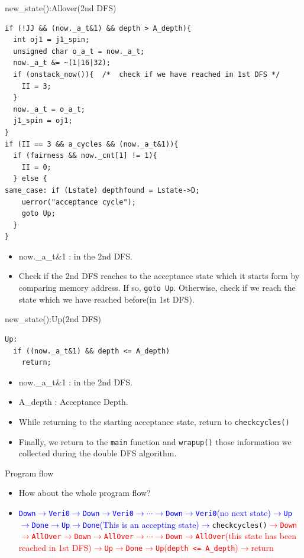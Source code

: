 \documentclass[12pt]{beamer}
\newcommand{\code}[1]{\texttt{#1}}
\begin{document}
\begin{frame}[fragile]{new\_state():Allover(2nd DFS)}
\begin{lstlisting}[basicstyle=\footnotesize\ttfamily]
if (!JJ && (now._a_t&1) && depth > A_depth){
  int oj1 = j1_spin;
  unsigned char o_a_t = now._a_t;
  now._a_t &= ~(1|16|32);
  if (onstack_now()){  /*  check if we have reached in 1st DFS */
    II = 3;
  }
  now._a_t = o_a_t;
  j1_spin = oj1;
}
if (II == 3 && a_cycles && (now._a_t&1)){
  if (fairness && now._cnt[1] != 1){
    II = 0;
  } else {
same_case: if (Lstate) depthfound = Lstate->D;
    uerror("acceptance cycle");
    goto Up;
  }
}
\end{lstlisting}
\begin{itemize}
	\item now.\_a\_t\&1 : in the 2nd DFS.
	\item Check if the 2nd DFS reaches to the acceptance state which it starts form by comparing memory address. If so, \code{goto Up}. Otherwise, check if we reach the state which we have reached before(in 1st DFS).
\end{itemize}
\end{frame}

\begin{frame}[fragile]{new\_state():Up(2nd DFS)}
\begin{lstlisting}[basicstyle=\footnotesize\ttfamily]
Up:
  if ((now._a_t&1) && depth <= A_depth)
    return;
\end{lstlisting}
\begin{itemize}
	\item now.\_a\_t\&1 : in the 2nd DFS.
	\item A\_depth : Acceptance Depth.
	\item While returning to the starting acceptance state, return to \code{checkcycles()}
	\item Finally, we return to the \code{main} function and \code{wrapup()} those information we collected during the double DFS algorithm.
\end{itemize}
\end{frame}

\begin{frame}[fragile]{Program flow}
\begin{itemize}
	\item How about the whole program flow?
	\item 
	\textcolor{blue}{\code{Down}$\rightarrow$\code{Veri0}$\rightarrow$\code{Down}$\rightarrow$\code{Veri0}$\rightarrow\cdots\rightarrow$\code{Down}$\rightarrow$\code{Veri0}(no next state)$\rightarrow$\code{Up}$\rightarrow$\code{Done}$\rightarrow$\code{Up}$\rightarrow$\code{Done}(This is an accepting state)$\rightarrow$}\code{checkcycles()}\textcolor{red}{$\rightarrow$\code{Down}$\rightarrow$\code{AllOver}$\rightarrow$\code{Down}$\rightarrow$\code{AllOver}$\rightarrow\cdots\rightarrow$\code{Down}$\rightarrow$\code{AllOver}(this state has been reached in 1st DFS)$\rightarrow$\code{Up}$\rightarrow$\code{Done}$\rightarrow$\code{Up}(\code{depth <= A\_depth})$\rightarrow$return}
\end{itemize}
\end{frame}
\end{document}
